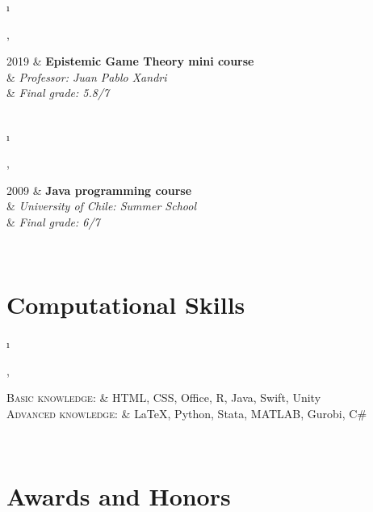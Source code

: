 \documentclass[a4paper, 10pt]{article}
\newcommand{\tablength}{}
\newcommand{\setTabParams}[1]{\renewcommand\tablength{}\forcsvlist{\listadd\tablength}{#1}}
\newcommand{\setCols}[1]{			%
	\ifnum0=\i						%
		\ifdim0cm=#1				%
			\def \firstCol {r}		%
		\else						%
			\def \firstCol {p{#1}}	%
		\fi							%
	\else \ifnum1=\i				%
		\ifdim0cm=#1				%
			\def \secondCol {l}		%
		\else						%
			\def \secondCol{p{#1}}	%
		\fi							%
	\else \ifnum2=\i				%
		\ifnum0=#1					%
			\def \sep {}			%
		\else						%
			\def \sep {|}			%
		\fi							%
	\fi \fi \fi						%
	\advance\i by1					%
}
\newcommand{\tab}[1]{							%
	\newcount\i									%
	\forlistloop{\setCols}{\tablength}			%
	\begin{tabular}{\firstCol \sep \secondCol}	%
		#1										%
	\end{tabular} \\[.5ex]						%
}
\begin{document}
\tab{
\textsc{2019}
 	&	\textbf{Epistemic Game Theory mini course }	\\[0.2ex]
	&	\emph{\quad Professor: Juan Pablo Xandri}		\\[0.2ex]
	&	\emph{\quad Final grade: 5.8/7}
}

\tab{
\textsc{2009}
 	&	\textbf{Java programming course}	\\[0.2ex]
	&	\emph{\quad University of Chile: Summer School}		\\[0.2ex]
	&	\emph{\quad Final grade: 6/7}
}

\section{Computational Skills}
\setTabParams{0cm,0cm,0}

\tab{
\textsc{Basic knowledge:}
	&	HTML, CSS, Office, R, Java, Swift, Unity 	\\[0.5ex]

\textsc{Advanced knowledge:}
	&	{\LaTeX}, Python, Stata, MATLAB, Gurobi, C\#	\\
}

\section{Awards and Honors}
\setTabParams{0cm,11cm,0}
\end{document}
